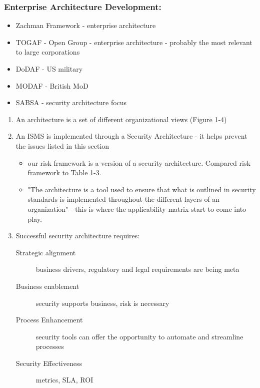 \documentclass[11pt]{article}
\begin{document}
\subsubsection{Enterprise Architecture Development:}
\label{sec:org0262b72}
\begin{itemize}
\item Zachman Framework - enterprise architecture
\item TOGAF - Open Group - enterprise architecture - probably the most relevant to large corporations
\item DoDAF - US military
\item MODAF - British MoD
\item SABSA - security architecture focus
\end{itemize}
\begin{enumerate}
\item An architecture is a set of different organizational views (Figure 1-4)
\label{sec:org258f3f5}
\item An ISMS is implemented through a Security Architecture - it helps prevent the issues listed in this section
\label{sec:orgf8548cf}
\begin{itemize}
\item our risk framework is a version of a security architecture. Compared risk framework to Table 1-3.
\item "The architecture is a tool used to ensure that what is outlined in security standards is implemented throughout the different layers of an organization" - this is where the applicability matrix start to come into play.
\end{itemize}
\item Successful security architecture requires:
\label{sec:org88c5be1}
\begin{description}
\item[{Strategic alignment}] business drivers, regulatory and legal requirements are being meta
\item[{Business enablement}] security supports business, risk is necessary
\item[{Process Enhancement}] security tools can offer the opportunity to automate and streamline processes
\item[{Security Effectiveness}] metrics, SLA, ROI
\end{description}
\end{enumerate}
\end{document}
